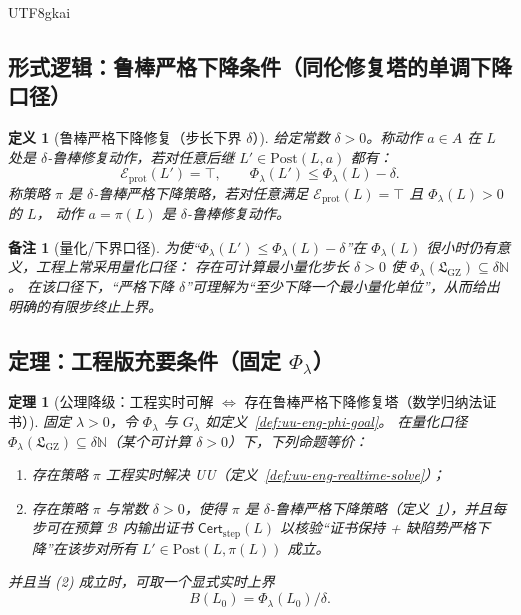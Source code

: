 \documentclass[12pt]{article}
\newtheorem{definition}{定义}[section]
\newtheorem{theorem}{定理}[section]
\newtheorem{remark}{备注}[section]
\newcommand{\NN}{\mathbb{N}}
\newcommand{\GZLS}{\ensuremath{\mathfrak{L}_{\mathrm{GZ}}}}
\begin{document}
\begin{CJK*}{UTF8}{gkai}
\subsection{形式逻辑：鲁棒严格下降条件（同伦修复塔的单调下降口径）}
\label{sec:uu-eng-robust-descent}

\begin{definition}[鲁棒严格下降修复（步长下界 $\delta$）]
\label{def:uu-eng-robust-descent}
给定常数 $\delta>0$。称动作 $a\in A$ 在 $L$ 处是 $\delta$-鲁棒修复动作，若对任意后继 $L'\in\mathrm{Post}(L,a)$ 都有：
\[
  \mathcal{E}_{\mathrm{prot}}(L')=\top,
  \qquad
  \Phi_\lambda(L')\le \Phi_\lambda(L)-\delta.
\]
称策略 $\pi$ 是 $\delta$-鲁棒严格下降策略，若对任意满足 $\mathcal{E}_{\mathrm{prot}}(L)=\top$ 且 $\Phi_\lambda(L)>0$ 的 $L$，
动作 $a=\pi(L)$ 是 $\delta$-鲁棒修复动作。
\end{definition}

\begin{remark}[量化/下界口径]
为使“$\Phi_\lambda(L')\le \Phi_\lambda(L)-\delta$”在 $\Phi_\lambda(L)$ 很小时仍有意义，工程上常采用量化口径：
存在可计算最小量化步长 $\delta>0$ 使 $\Phi_\lambda(\GZLS)\subseteq \delta\NN$。
在该口径下，“严格下降 $\delta$”可理解为“至少下降一个最小量化单位”，从而给出明确的有限步终止上界。
\end{remark}

\subsection{定理：工程版充要条件（固定 $\Phi_\lambda$）}
\label{sec:uu-eng-iff-theorem}

\begin{theorem}[公理降级：工程实时可解 $\Longleftrightarrow$ 存在鲁棒严格下降修复塔（数学归纳法证书）]
\label{thm:uu-eng-iff}
固定 $\lambda>0$，令 $\Phi_\lambda$ 与 $G_\lambda$ 如定义~\ref{def:uu-eng-phi-goal}。
在量化口径 $\Phi_\lambda(\GZLS)\subseteq \delta\NN$（某个可计算 $\delta>0$）下，下列命题等价：
\begin{enumerate}
  \item 存在策略 $\pi$ 工程实时解决 UU（定义~\ref{def:uu-eng-realtime-solve}）；
  \item 存在策略 $\pi$ 与常数 $\delta>0$，使得 $\pi$ 是 $\delta$-鲁棒严格下降策略（定义~\ref{def:uu-eng-robust-descent}），并且每步可在预算 $\mathcal{B}
    $ 内输出证书
  $\mathsf{Cert}_{\mathrm{step}}(L)$ 以核验“证书保持 + 缺陷势严格下降”在该步对所有 $L'\in\mathrm{Post}(L,\pi(L))$ 成立。
\end{enumerate}
并且当 (2) 成立时，可取一个显式实时上界
\[
  B(L_0)=\Phi_\lambda(L_0)/\delta.
\]
\end{theorem}


\end{CJK*}
\end{document}
